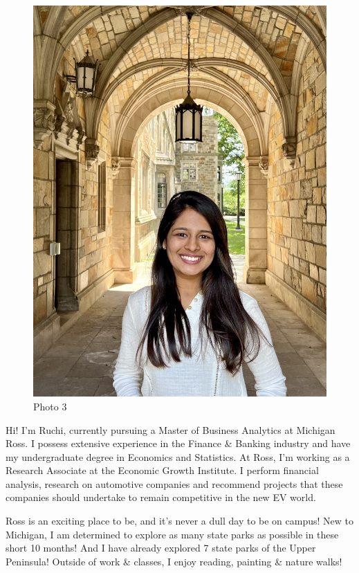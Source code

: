 \documentclass[
]{article}
\begin{document}
\begin{figure}
\centering
\includegraphics{Ruchi Profile.jpg}
\caption{Photo 3}
\end{figure}

Hi! I'm Ruchi, currently pursuing a Master of Business Analytics at Michigan Ross. I possess extensive experience in the Finance \& Banking industry and have my undergraduate degree in Economics and Statistics.
At Ross, I'm working as a Research Associate at the Economic Growth Institute. I perform financial analysis, research on automotive companies and recommend projects that these companies should undertake to remain competitive in the new EV world.

Ross is an exciting place to be, and it's never a dull day to be on campus! New to Michigan, I am determined to explore as many state parks as possible in these short 10 months! And I have already explored 7 state parks of the Upper Peninsula! Outside of work \& classes, I enjoy reading, painting \& nature walks!
\end{document}
